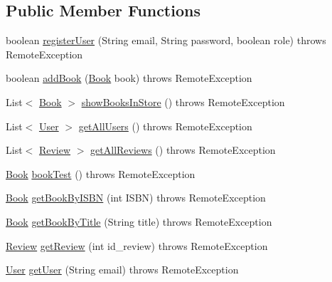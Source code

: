 \subsection*{Public Member Functions}
\begin{DoxyCompactItemize}
\item 
boolean \hyperlink{interfaceserver_1_1remote_1_1_i_remote_a2e426f5eb58352993207ce0a24539f81}{register\+User} (String email, String password, boolean role)  throws Remote\+Exception
\item 
boolean \hyperlink{interfaceserver_1_1remote_1_1_i_remote_a3b11a0e182873e445ec8546394e36373}{add\+Book} (\hyperlink{classserver_1_1data_1_1_book}{Book} book)  throws Remote\+Exception
\item 
List$<$ \hyperlink{classserver_1_1data_1_1_book}{Book} $>$ \hyperlink{interfaceserver_1_1remote_1_1_i_remote_ac8a764235c51eff20d635f40707e377e}{show\+Books\+In\+Store} ()  throws Remote\+Exception
\item 
List$<$ \hyperlink{classserver_1_1data_1_1_user}{User} $>$ \hyperlink{interfaceserver_1_1remote_1_1_i_remote_a3ff8752a1911b6ca54fc4a04af90fe7a}{get\+All\+Users} ()  throws Remote\+Exception
\item 
List$<$ \hyperlink{classserver_1_1data_1_1_review}{Review} $>$ \hyperlink{interfaceserver_1_1remote_1_1_i_remote_a017e07cb93ae582188c20d7b1ce6b014}{get\+All\+Reviews} ()  throws Remote\+Exception
\item 
\hyperlink{classserver_1_1data_1_1_book}{Book} \hyperlink{interfaceserver_1_1remote_1_1_i_remote_a7d561f9f92fb53177f2d3e49e445148a}{book\+Test} ()  throws Remote\+Exception
\item 
\hyperlink{classserver_1_1data_1_1_book}{Book} \hyperlink{interfaceserver_1_1remote_1_1_i_remote_a736183bf7a57f78acf11fb78ae0f0e58}{get\+Book\+By\+I\+S\+BN} (int I\+S\+BN)  throws Remote\+Exception
\item 
\hyperlink{classserver_1_1data_1_1_book}{Book} \hyperlink{interfaceserver_1_1remote_1_1_i_remote_a520cc1af90d13264c14b32e19b5ce712}{get\+Book\+By\+Title} (String title)  throws Remote\+Exception
\item 
\hyperlink{classserver_1_1data_1_1_review}{Review} \hyperlink{interfaceserver_1_1remote_1_1_i_remote_a7b3462a438579c85dc7f097acf9cec41}{get\+Review} (int id\+\_\+review)  throws Remote\+Exception
\item 
\hyperlink{classserver_1_1data_1_1_user}{User} \hyperlink{interfaceserver_1_1remote_1_1_i_remote_ab741cf58a7e2b18ba36069d14d9d04ef}{get\+User} (String email)  throws Remote\+Exception

\end{DoxyCompactItemize}
